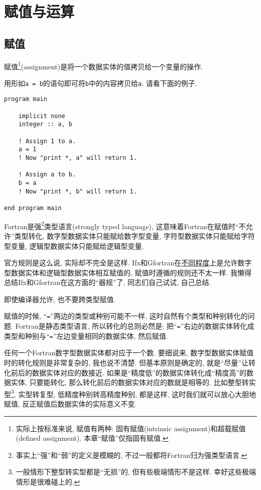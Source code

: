 \chapter{赋值与运算}

\section{赋值}\label{fortran_assignment}

赋值\footnote{
    实际上按标准来说, 赋值有两种: 固有赋值(intrinsic assignment)和超载赋值(defined assignment). 本章``赋值''仅指固有赋值.
}(assignment)是将一个数据实体的值拷贝给一个变量的操作.

用形如\texttt{a = b}的语句即可将\texttt{b}中的内容拷贝给\texttt{a}. 请看下面的例子.
\begin{lstlisting}
program main

    implicit none
    integer :: a, b

    ! Assign 1 to a.
    a = 1
    ! Now "print *, a" will return 1.

    ! Assign a to b.
    b = a
    ! Now "print *, b" will return 1.

end program main
\end{lstlisting}

Fortran是强\footnote{
    事实上``强''和``弱''的定义是模糊的, 不过一般都将Fortran归为强类型语言.
}类型语言(strongly typed language), 这意味着Fortran在赋值时``不允许''类型转化, 数字型数据实体只能赋给数字型变量, 字符型数据实体只能赋给字符型变量, 逻辑型数据实体只能赋给逻辑型变量.

官方规则是这么说, 实际却不完全是这样. Ifx和Gfortran在\uline{不同程度}上是允许数字型数据实体和逻辑型数据实体相互赋值的, 赋值时遵循的规则还不太一样. 我懒得总结Ifx和Gfortran在这方面的``器规''了, 同志们自己试试, 自己总结.

\begin{convention}
    即使编译器允许, 也不要跨类型赋值.
\end{convention}

赋值的时候, ``\texttt{=}''两边的类型或种别可能不一样, 这时自然有个类型和种别转化的问题. Fortran是静态类型语言, 所以转化的总则必然是: 把``\texttt{=}''右边的数据实体转化成类型和种别与``\texttt{=}''左边变量相同的数据实体, 然后赋值.

任何一个Fortran数字型数据实体都对应于一个数. 要细说来, 数字型数据实体赋值时的转化规则是非常复杂的, 我也说不清楚. 但基本原则是确定的, 就是``尽量''让转化前后的数据实体对应的数接近. 如果是``精度低''的数据实体转化成``精度高''的数据实体, 只要能转化, 那么转化前后的数据实体对应的数就是相等的. 比如整型转实型\footnote{
    一般情形下整型转实型都是``无损''的, 但有些极端情形不是这样. 幸好这些极端情形是很难碰上的.
}, 实型转复型, 低精度种别转高精度种别, 都是这样, 这时我们就可以放心大胆地赋值, 反正赋值后数据实体的实际意义不变.

